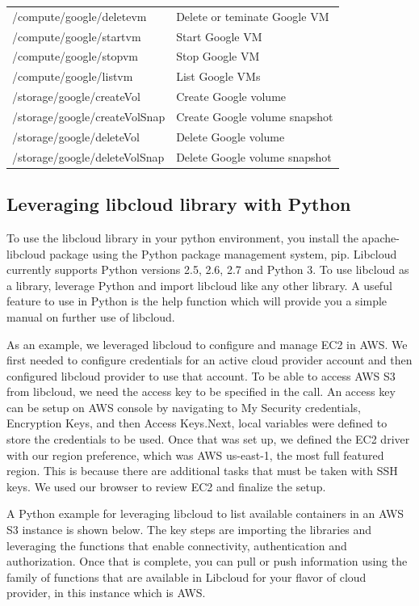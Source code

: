 \begin{table}[htb]
\begin{tabular} {p{5cm}|p{3.5cm}}
/compute/google/deletevm & Delete or teminate Google VM \\
/compute/google/startvm & Start Google VM \\
/compute/google/stopvm & Stop Google VM \\
/compute/google/listvm & List Google VMs \\
/storage/google/createVol & Create Google volume \\
/storage/google/createVolSnap & Create Google volume snapshot \\
/storage/google/deleteVol & Delete Google volume \\
/storage/google/deleteVolSnap & Delete Google volume snapshot \\
\end{tabular}
\end{table}

\subsection{Leveraging libcloud library with Python}

To use the libcloud library in your python environment, you install the
apache-libcloud package using the Python package management system, pip.
Libcloud currently supports Python versions 2.5, 2.6, 2.7 and Python 3. To use
libcloud as a library, leverage Python and import libcloud like any other
library. A useful feature to use in Python is the help function which will
provide you a simple manual on further use of libcloud.

As an example, we leveraged libcloud to configure and manage EC2 in AWS. We
first needed to configure credentials for an active cloud provider account and
then configured libcloud provider to use that account. To be able to access AWS
S3 from libcloud, we need the access key to be specified in the call. An access
key can be setup on AWS console by navigating to My Security credentials,
Encryption Keys, and then Access Keys.Next, local variables were defined to
store the credentials to be used. Once that was set up, we defined the EC2 
driver with our region preference, which was AWS us-east-1, the most full
featured region. This is because there are additional tasks that must be taken
with SSH keys. We used our browser to review EC2 and finalize the setup.

A Python example for leveraging libcloud to list available containers in an AWS
S3 instance is shown below. The key steps are importing the libraries and
leveraging the functions that enable connectivity, authentication and
authorization. Once that is complete, you can pull or push information using
the family of functions that are available in Libcloud for your flavor of cloud
provider, in this instance which is AWS.

